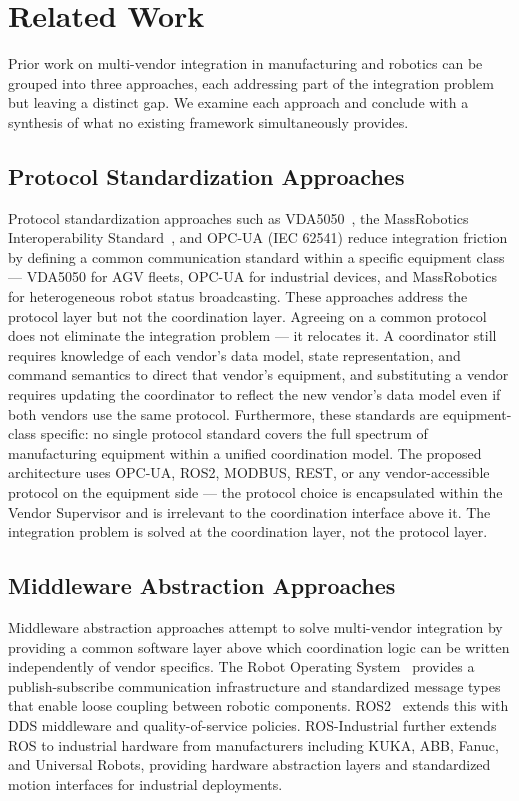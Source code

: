 \documentclass[a4paper,fleqn]{cas-dc}
\begin{document}
\section{Related Work}
\label{sec:related}

Prior work on multi-vendor integration in manufacturing and robotics can be grouped into three approaches, each addressing part of the integration problem but leaving a distinct gap. We examine each approach and conclude with a synthesis of what no existing framework simultaneously provides.

\subsection{Protocol Standardization Approaches}

Protocol standardization approaches such as VDA5050~\cite{vda5050}, the MassRobotics Interoperability Standard~\cite{massrobotics2020}, and OPC-UA (IEC 62541) reduce integration friction by defining a common communication standard within a specific equipment class — VDA5050 for AGV fleets, OPC-UA for industrial devices, and MassRobotics for heterogeneous robot status broadcasting. These approaches address the protocol layer but not the coordination layer. Agreeing on a common protocol does not eliminate the integration problem — it relocates it. A coordinator still requires knowledge of each vendor's data model, state representation, and command semantics to direct that vendor's equipment, and substituting a vendor requires updating the coordinator to reflect the new vendor's data model even if both vendors use the same protocol. Furthermore, these standards are equipment-class specific: no single protocol standard covers the full spectrum of manufacturing equipment within a unified coordination model. The proposed architecture uses OPC-UA, ROS2, MODBUS, REST, or any vendor-accessible protocol on the equipment side — the protocol choice is encapsulated within the Vendor Supervisor and is irrelevant to the coordination interface above it. The integration problem is solved at the coordination layer, not the protocol layer.

\subsection{Middleware Abstraction Approaches}

Middleware abstraction approaches attempt to solve multi-vendor integration by providing a common software layer above which coordination logic can be written independently of vendor specifics. The Robot Operating System~\cite{quigley2009ros} provides a publish-subscribe communication infrastructure and standardized message types that enable loose coupling between robotic components. ROS2~\cite{maruyama2016exploring} extends this with DDS middleware and quality-of-service policies. ROS-Industrial further extends ROS to industrial hardware from manufacturers including KUKA, ABB, Fanuc, and Universal Robots, providing hardware abstraction layers and standardized motion interfaces for industrial deployments.
\end{document}
